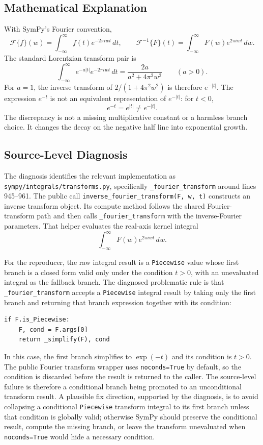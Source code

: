 \documentclass[11pt]{article}
\begin{document}
\subsection{Mathematical Explanation}

With SymPy's Fourier convention,
\[
  \mathcal{F}\{f\}(w)
  = \int_{-\infty}^{\infty} f(t)e^{-2\pi iwt}\,dt,
  \qquad
  \mathcal{F}^{-1}\{F\}(t)
  = \int_{-\infty}^{\infty} F(w)e^{2\pi iwt}\,dw .
\]
The standard Lorentzian transform pair is
\[
  \int_{-\infty}^{\infty} e^{-a|t|}e^{-2\pi iwt}\,dt
  = \frac{2a}{a^2+4\pi^2w^2}
  \qquad (a>0).
\]
For \(a=1\), the inverse transform of
\(2/(1+4\pi^2w^2)\) is therefore \(e^{-|t|}\).  The expression \(e^{-t}\) is
not an equivalent representation of \(e^{-|t|}\): for \(t<0\),
\[
  e^{-t}=e^{|t|}\neq e^{-|t|}.
\]
The discrepancy is not a missing multiplicative constant or a harmless branch
choice.  It changes the decay on the negative half line into exponential growth.

\subsection{Source-Level Diagnosis}

The diagnosis identifies the relevant implementation as
\nolinkurl{sympy/integrals/transforms.py}, specifically
\texttt{\_fourier\_transform} around lines 945--961.  The public call
\texttt{inverse\_fourier\_transform(F, w, t)} constructs an inverse transform
object.  Its compute method follows the shared Fourier-transform path and then
calls \texttt{\_fourier\_transform} with the inverse-Fourier parameters.
That helper evaluates the real-axis kernel integral
\[
  \int_{-\infty}^{\infty} F(w)e^{2\pi iwt}\,dw .
\]

For the reproducer, the raw integral result is a \texttt{Piecewise} value whose
first branch is a closed form valid only under the condition \(t>0\), with an
unevaluated integral as the fallback branch.  The diagnosed problematic rule is
that \texttt{\_fourier\_transform} accepts a \texttt{Piecewise} integral result
by taking only the first branch and returning that branch expression together
with its condition:

\begin{lstlisting}[style=bugpython]
if F.is_Piecewise:
    F, cond = F.args[0]
    return _simplify(F), cond
\end{lstlisting}

In this case, the first branch simplifies to \(\exp(-t)\) and its condition is
\(t>0\).  The public Fourier transform wrapper uses \texttt{noconds=True} by
default, so the condition is discarded before the result is returned to the
caller.  The source-level failure is therefore a conditional branch being
promoted to an unconditional transform result.  A plausible fix direction,
supported by the diagnosis, is to avoid collapsing a conditional
\texttt{Piecewise} transform integral to its first branch unless that condition
is globally valid; otherwise SymPy should preserve the conditional result,
compute the missing branch, or leave the transform unevaluated when
\texttt{noconds=True} would hide a necessary condition.
\end{document}
